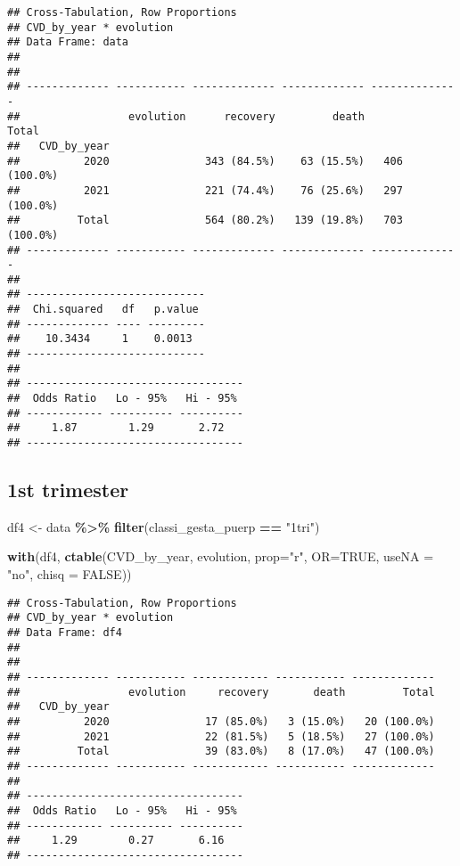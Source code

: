 \documentclass[
]{article}
\newenvironment{Shaded}{\begin{snugshade}}{\end{snugshade}}
\newcommand{\AttributeTok}[1]{\textcolor[rgb]{0.13,0.29,0.53}{#1}}
\newcommand{\ConstantTok}[1]{\textcolor[rgb]{0.56,0.35,0.01}{#1}}
\newcommand{\FunctionTok}[1]{\textcolor[rgb]{0.13,0.29,0.53}{\textbf{#1}}}
\newcommand{\NormalTok}[1]{#1}
\newcommand{\OtherTok}[1]{\textcolor[rgb]{0.56,0.35,0.01}{#1}}
\newcommand{\SpecialCharTok}[1]{\textcolor[rgb]{0.81,0.36,0.00}{\textbf{#1}}}
\newcommand{\StringTok}[1]{\textcolor[rgb]{0.31,0.60,0.02}{#1}}
\begin{document}
\begin{verbatim}
## Cross-Tabulation, Row Proportions  
## CVD_by_year * evolution  
## Data Frame: data  
## 
## 
## ------------- ----------- ------------- ------------- --------------
##                 evolution      recovery         death          Total
##   CVD_by_year                                                       
##          2020               343 (84.5%)    63 (15.5%)   406 (100.0%)
##          2021               221 (74.4%)    76 (25.6%)   297 (100.0%)
##         Total               564 (80.2%)   139 (19.8%)   703 (100.0%)
## ------------- ----------- ------------- ------------- --------------
## 
## ----------------------------
##  Chi.squared   df   p.value 
## ------------- ---- ---------
##    10.3434     1    0.0013  
## ----------------------------
## 
## ----------------------------------
##  Odds Ratio   Lo - 95%   Hi - 95% 
## ------------ ---------- ----------
##     1.87        1.29       2.72   
## ----------------------------------
\end{verbatim}

\hypertarget{st-trimester-8}{%
\subsection{1st trimester}\label{st-trimester-8}}

\begin{Shaded}
\begin{Highlighting}[]
\NormalTok{df4 }\OtherTok{\textless{}{-}}\NormalTok{ data }\SpecialCharTok{\%\textgreater{}\%} 
  \FunctionTok{filter}\NormalTok{(classi\_gesta\_puerp }\SpecialCharTok{==} \StringTok{"1tri"}\NormalTok{)}

\FunctionTok{with}\NormalTok{(df4, }\FunctionTok{ctable}\NormalTok{(CVD\_by\_year, evolution, }\AttributeTok{prop=}\StringTok{"r"}\NormalTok{, }\AttributeTok{OR=}\ConstantTok{TRUE}\NormalTok{, }\AttributeTok{useNA =} \StringTok{"no"}\NormalTok{, }\AttributeTok{chisq =} \ConstantTok{FALSE}\NormalTok{))}
\end{Highlighting}
\end{Shaded}

\begin{verbatim}
## Cross-Tabulation, Row Proportions  
## CVD_by_year * evolution  
## Data Frame: df4  
## 
## 
## ------------- ----------- ------------ ----------- -------------
##                 evolution     recovery       death         Total
##   CVD_by_year                                                   
##          2020               17 (85.0%)   3 (15.0%)   20 (100.0%)
##          2021               22 (81.5%)   5 (18.5%)   27 (100.0%)
##         Total               39 (83.0%)   8 (17.0%)   47 (100.0%)
## ------------- ----------- ------------ ----------- -------------
## 
## ----------------------------------
##  Odds Ratio   Lo - 95%   Hi - 95% 
## ------------ ---------- ----------
##     1.29        0.27       6.16   
## ----------------------------------
\end{verbatim}
\end{document}
